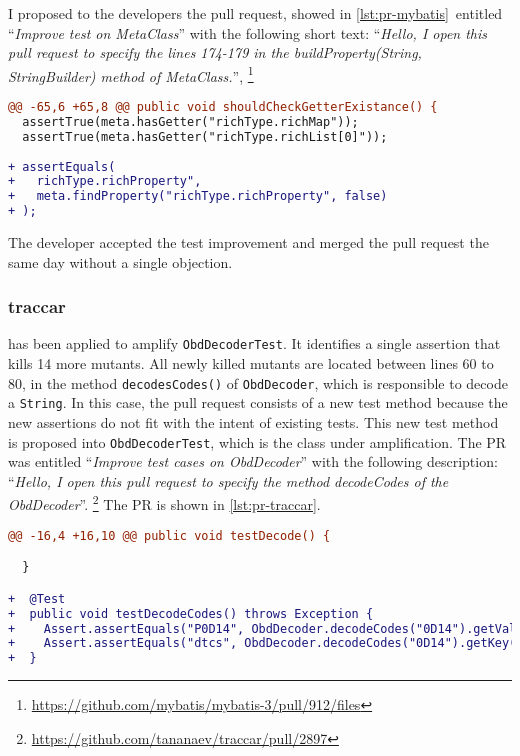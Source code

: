 I proposed to the developers the pull request, showed in \autoref{lst:pr-mybatis}~entitled ``\emph{Improve test on MetaClass}'' with the following short text: ``\emph{Hello, I open this pull request to specify the lines 174-179 in the buildProperty(String, StringBuilder) method of MetaClass.}'', \footnote{\url{https://github.com/mybatis/mybatis-3/pull/912/files}}

\begin{lstlisting}[language=diff,caption=Test-improvement proposed to MyBatis-3 developers.,label=lst:pr-mybatis]
@@ -65,6 +65,8 @@ public void shouldCheckGetterExistance() {
  assertTrue(meta.hasGetter("richType.richMap"));
  assertTrue(meta.hasGetter("richType.richList[0]"));
        
+ assertEquals(
+   richType.richProperty", 
+   meta.findProperty("richType.richProperty", false)
+ );
\end{lstlisting}

The developer accepted the test improvement and merged the pull request the same day without a single objection. 

\subsubsection{traccar}

\dspot has been applied to amplify \texttt{ObdDecoderTest}. 
It identifies a single assertion that kills 14 more mutants.
All newly killed mutants are located between lines 60 to 80, \ie in the method \texttt{decodesCodes()} of \texttt{ObdDecoder}, which is responsible to decode a \texttt{String}. 
In this case, the pull request consists of a new test method because the new assertions do not fit with the intent of existing tests. 
This new test method is proposed into \texttt{ObdDecoderTest}, which is the class under amplification. 
The PR was entitled ``\emph{Improve test cases on ObdDecoder}'' with the following description: ``\emph{Hello, I open this pull request to specify the method decodeCodes of the ObdDecoder}''. \footnote{\url{https://github.com/tananaev/traccar/pull/2897}}
The PR is shown in \autoref{lst:pr-traccar}.

\begin{lstlisting}[language=diff,caption=Test-improvement proposed to traccar developers.,label=lst:pr-traccar]
@@ -16,4 +16,10 @@ public void testDecode() {

  }

+  @Test
+  public void testDecodeCodes() throws Exception {
+    Assert.assertEquals("P0D14", ObdDecoder.decodeCodes("0D14").getValue());
+    Assert.assertEquals("dtcs", ObdDecoder.decodeCodes("0D14").getKey());
+  }
\end{lstlisting}

